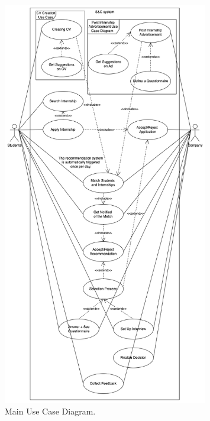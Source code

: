 \begin{figure}[H]
\centering
\includegraphics[width=0.8\textwidth]{Images/Main_Use_Case_Diagram.png}
\caption{\label{fig:metamodel9}Main Use Case Diagram.}
\end{figure}

